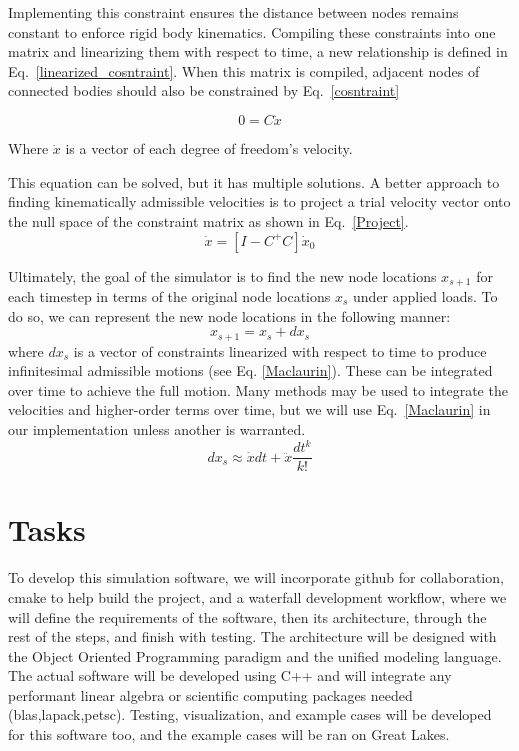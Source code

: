 \documentclass[letterpaper]{article}
\begin{document}
Implementing this constraint ensures the distance between nodes remains constant to enforce rigid body kinematics. Compiling these constraints into one matrix and linearizing them with respect to time, a new relationship is defined in Eq.~\ref{linearized_cosntraint}. When this matrix is compiled, adjacent nodes of connected bodies should also be constrained by Eq.~\ref{cosntraint}

\begin{equation}
    0=C\dot x
    \label{linearized_cosntraint}
\end{equation}

Where $\dot x$ is a vector of each degree of freedom's velocity. 

This equation can be solved, but it has multiple solutions. A better approach to finding kinematically admissible velocities is to project a trial velocity vector onto the null space of the constraint matrix as shown in Eq.~\ref{Project}.
\begin{equation}
    \dot x=[I-C^+C]\dot x_0
    \label{Project}
\end{equation}


Ultimately, the goal of the simulator is to find the new node locations $x_{s+1}$ for each timestep in terms of the original node locations $x_s$ under applied loads. To do so, we can represent the new node locations in the following manner:
\begin{equation}
    x_{s+1}=x_s+dx_s
\end{equation}
where $dx_s$ is a vector of constraints linearized with respect to time to produce infinitesimal admissible motions (see Eq. \ref{Maclaurin}). These can be integrated over time to achieve the full motion. Many methods may be used to integrate the velocities and higher-order terms over time, but we will use Eq.~\ref{Maclaurin} in our implementation unless another is warranted.
\begin{equation}
    dx_s\approx \dot{x}dt+\ddot{x} \frac{dt^k}{k!}
    \label{Maclaurin}
\end{equation}

\section*{Tasks}
To develop this simulation software, we will incorporate github for collaboration, cmake to help build the project, and a waterfall development workflow, where we will define the requirements of the software, then its architecture, through the rest of the steps, and finish with testing. The architecture will be designed with the Object Oriented Programming paradigm and the unified modeling language. The actual software will be developed using C++ and will integrate any performant linear algebra or scientific computing packages needed (blas,lapack,petsc). Testing, visualization, and example cases will be developed for this software too, and the example cases will be ran on Great Lakes.
\end{document}
